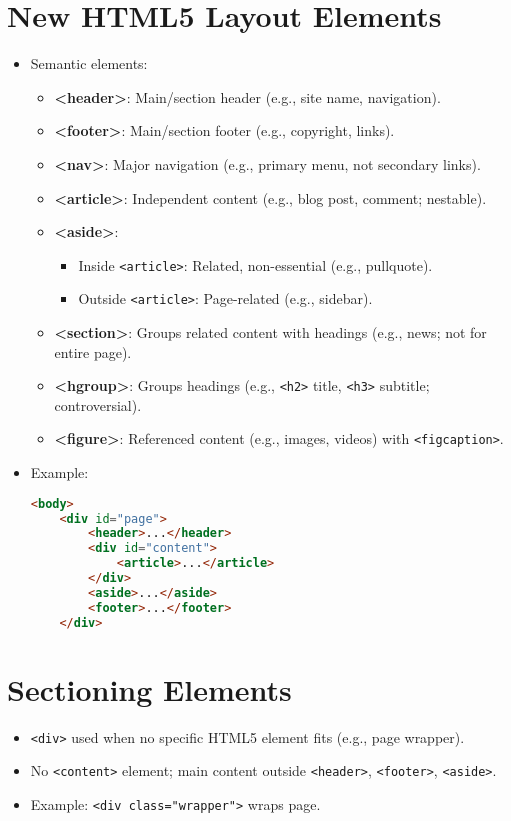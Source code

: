 \documentclass[a4paper,11pt]{article}
\newcommand{\code}[1]{\texttt{#1}}
\newcommand{\emphitem}[1]{\item \textbf{#1}}
\begin{document}
\section{New HTML5 Layout Elements}
\begin{itemize}
    \item Semantic elements:
    \begin{itemize}
        \emphitem{<header>}: Main/section header (e.g., site name, navigation).
        \emphitem{<footer>}: Main/section footer (e.g., copyright, links).
        \emphitem{<nav>}: Major navigation (e.g., primary menu, not secondary links).
        \emphitem{<article>}: Independent content (e.g., blog post, comment; nestable).
        \emphitem{<aside>}:
        \begin{itemize}
            \item Inside \code{<article>}: Related, non-essential (e.g., pullquote).
            \item Outside \code{<article>}: Page-related (e.g., sidebar).
        \end{itemize}
        \emphitem{<section>}: Groups related content with headings (e.g., news; not for entire page).
        \emphitem{<hgroup>}: Groups headings (e.g., \code{<h2>} title, \code{<h3>} subtitle; controversial).
        \emphitem{<figure>}: Referenced content (e.g., images, videos) with \code{<figcaption>}.
    \end{itemize}
    \item Example:
    \begin{lstlisting}[language=HTML]
<body>
    <div id="page">
        <header>...</header>
        <div id="content">
            <article>...</article>
        </div>
        <aside>...</aside>
        <footer>...</footer>
    </div>
    \end{lstlisting}
\end{itemize}

\section{Sectioning Elements}
\begin{itemize}
    \item \code{<div>} used when no specific HTML5 element fits (e.g., page wrapper).
    \item No \code{<content>} element; main content outside \code{<header>}, \code{<footer>}, \code{<aside>}.
    \item Example: \code{<div class="wrapper">} wraps page.
\end{itemize}
\end{document}
